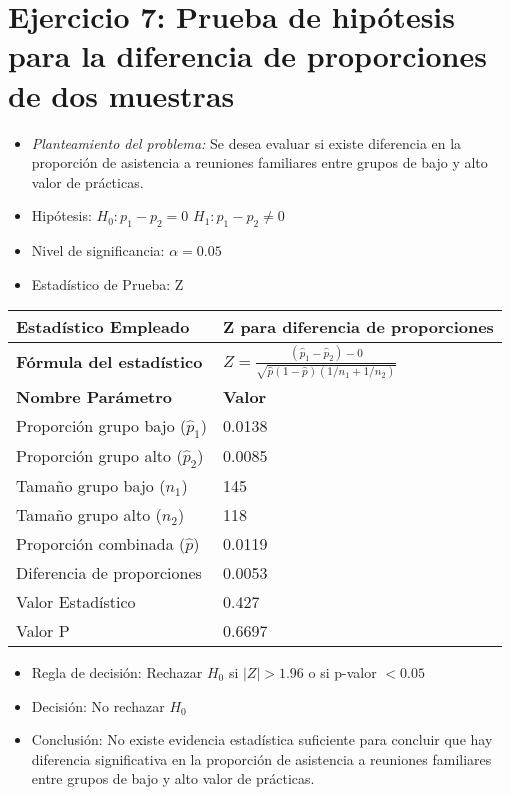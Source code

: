\documentclass[12pt,a4paper]{article}
\begin{document}
\section*{Ejercicio 7: Prueba de hipótesis para la diferencia de proporciones de dos muestras}
\begin{itemize}
    \item \textit{Planteamiento del problema:} Se desea evaluar si existe diferencia en la proporción de asistencia a reuniones familiares entre grupos de bajo y alto valor de prácticas.
    \item Hipótesis: \quad $H_{0}: p_1 - p_2 = 0$ \hspace{2cm} $H_{1}: p_1 - p_2 \neq 0$
    \item Nivel de significancia: $\alpha = 0.05$
    \item Estadístico de Prueba: Z
\end{itemize}

\begin{tabular}{|m{7cm}|m{7cm}|}
\hline
\textbf{Estadístico Empleado} & Z para diferencia de proporciones \\ \hline
\textbf{Fórmula del estadístico} & $Z = \frac{(\hat{p}_1 - \hat{p}_2) - 0}{\sqrt{\hat{p}(1-\hat{p})(1/n_1 + 1/n_2)}}$ \\ \hline
\textbf{Nombre Parámetro} & \textbf{Valor} \\ \hline
Proporción grupo bajo ($\hat{p}_1$) & 0.0138 \\ \hline
Proporción grupo alto ($\hat{p}_2$) & 0.0085 \\ \hline
Tamaño grupo bajo ($n_1$) & 145 \\ \hline
Tamaño grupo alto ($n_2$) & 118 \\ \hline
Proporción combinada ($\hat{p}$) & 0.0119 \\ \hline
Diferencia de proporciones & 0.0053 \\ \hline
Valor Estadístico & 0.427 \\ \hline
Valor P & 0.6697 \\ \hline
\end{tabular}

\begin{itemize}
    \item Regla de decisión: Rechazar $H_0$ si $|Z| > 1.96$ o si p-valor $< 0.05$
    \item Decisión: No rechazar $H_0$
    \item Conclusión: No existe evidencia estadística suficiente para concluir que hay diferencia significativa en la proporción de asistencia a reuniones familiares entre grupos de bajo y alto valor de prácticas.
\end{itemize}
\end{document}

